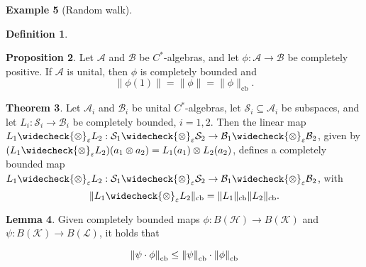 \documentclass[10pt,a4paper]{amsart}
\theoremstyle{definition}
\newtheorem{definition}{Definition}[section]
\theoremstyle{definition}
\newtheorem{example}[definition]{Example}
\theoremstyle{definition}
\newtheorem{lemma}[definition]{Lemma}
\theoremstyle{definition}
\newtheorem{proposition}[definition]{Proposition}
\theoremstyle{definition}
\theoremstyle{definition}
\newtheorem{theorem}[definition]{Theorem}
\begin{document}
\begin{example}[Random walk]
\begin{definition}
\end{definition}


\begin{proposition} \label{prop:cp_cb} \cite[Exercise 11.5 (iii)]{pisierIntroductionOperatorSpace2003}
  Let $\mathcal{A}$ and $\mathcal{B}$ be $C^*$-algebras, and let $\phi: \mathcal{A} \to \mathcal{B}$ be completely positive. If $\mathcal{A}$ is unital, then $\phi$ is completely bounded and 
\[
\|\phi(1)\| = \|\phi\| = \|\phi\|_{\text{cb}}.
\]
\end{proposition}


\begin{theorem} \label{thm:tensor_cb} \cite[Proposition 12.3]{paulsenCompletelyBoundedMaps2003}
  Let $\mathcal{A}_i$ and $\mathcal{B}_i$ be unital $C^*$-algebras, let $\mathcal{S}_i \subseteq \mathcal{A}_i$ be subspaces, 
and let $L_i: \mathcal{S}_i \to \mathcal{B}_i$ be completely bounded, $i = 1,2$. Then the linear map $L_1 \widecheck{\otimes}_\varepsilon 
L_2: \mathcal{S}_1 \widecheck{\otimes}_\varepsilon \mathcal{S}_2 \to \mathcal{B}_1 \widecheck{\otimes}_\varepsilon \mathcal{B}_2$, given by $(L_1 \widecheck{\otimes}_\varepsilon L_2)(a_1 \otimes a_2) = L_1(a_1) \otimes L_2(a_2)$, 
defines a completely bounded map $L_1 \widecheck{\otimes}_\varepsilon L_2: \mathcal{S}_1 \widecheck{\otimes}_\varepsilon \mathcal{S}_2 \to \mathcal{B}_1 \widecheck{\otimes}_\varepsilon \mathcal{B}_2$, with
\[
\|L_1 \widecheck{\otimes}_\varepsilon L_2\|_{\text{cb}} = \|L_1\|_{\text{cb}} \|L_2\|_{\text{cb}}.
\]
\end{theorem}

\begin{comment}

\begin{proposition} \cite[Proposition 3.2.2]{effrosOperatorSpaces2000} \label{prop:cb_dual}
  Given $C^*$-algebras $\mathcal{A}$ and $\mathcal{B}$, and a completely bounded mapping $\phi : A \to B$, we have
\[
\|\phi^*\|_{\text{cb}} =  \|\phi\|_{\text{cb}}.
\]
\end{proposition}

\end{comment}

\begin{lemma} \cite[p.19]{pisierIntroductionOperatorSpace2003} \label{lem:cb_comp_submult}
  Given completely bounded maps $\phi: B (\mathcal{H}) \to B (\mathcal{K}) $ and $\psi: B (\mathcal{K}) \to B (\mathcal{L})$, it holds that

  $$ \left\lVert \psi \cdot \phi \right\rVert_{\text{cb}} \leq \left\lVert \psi \right\rVert_{\text{cb}} \cdot \left\lVert \phi \right\rVert_{\text{cb}}  $$
\end{lemma}


\end{example}
\end{document}
